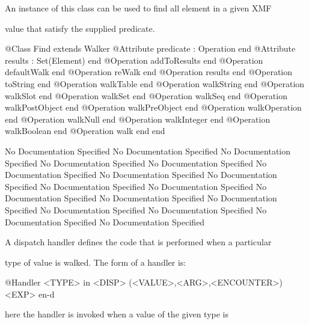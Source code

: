       An instance of this class can be used to find all element in a given XMF

      value that satisfy the supplied predicate.
\begin{Interface}
@Class Find extends Walker
  @Attribute predicate : Operation end
  @Attribute results : Set(Element) end
  @Operation addToResults end
  @Operation defaultWalk end
  @Operation reWalk end
  @Operation results end
  @Operation toString end
  @Operation walkTable end
  @Operation walkString end
  @Operation walkSlot end
  @Operation walkSet end
  @Operation walkSeq end
  @Operation walkPostObject end
  @Operation walkPreObject end
  @Operation walkOperation end
  @Operation walkNull end
  @Operation walkInteger end
  @Operation walkBoolean end
  @Operation walk end
end
\end{Interface}
No Documentation Specified
No Documentation Specified
No Documentation Specified
No Documentation Specified
No Documentation Specified
No Documentation Specified
No Documentation Specified
No Documentation Specified
No Documentation Specified
No Documentation Specified
No Documentation Specified
No Documentation Specified
No Documentation Specified
No Documentation Specified
No Documentation Specified
No Documentation Specified
No Documentation Specified

      A dispatch handler defines the code that is performed when a particular

      type of value is walked. The form of a handler is:

      @Handler <TYPE> in <DISP> (<VALUE>,<ARG>,<ENCOUNTER>) <EXP> en-d

      here the handler is invoked when a value of the given type is

